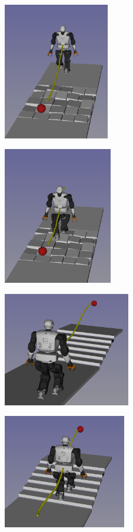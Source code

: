 \begin{figure}[H]
    \captionsetup[subfigure]{justification=centering}
    \centering
    \begin{subfigure}[t]{0.4\linewidth}
        \includegraphics[width=\textwidth, height=6cm]{Figures/Chapter_CPSB/rubbles_0.png}
    \end{subfigure}
    \begin{subfigure}[t]{0.4\linewidth}
        \includegraphics[width=\textwidth, height=6cm]{Figures/Chapter_CPSB/rubbles_1.png}
    \end{subfigure}
    \begin{subfigure}[t]{0.4\linewidth}
        \includegraphics[width=\textwidth, height=5cm]{Figures/Chapter_CPSB/stairs_diago.png}
    \end{subfigure}
    \begin{subfigure}[t]{0.4\linewidth}
        \includegraphics[width=\textwidth, height=5cm]{Figures/Chapter_CPSB/stairs_diago1.png}

\end{subfigure}
\end{figure}
